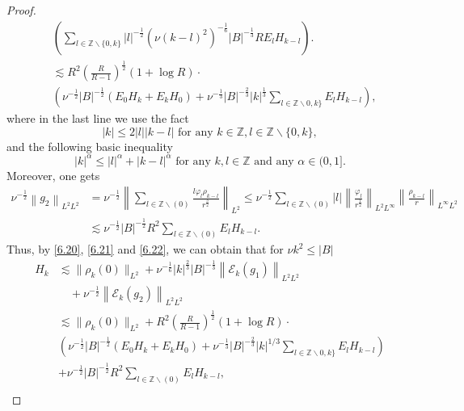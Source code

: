 \documentclass[final, 12pt,reqno]{amsart}
\numberwithin{equation}{section}
\begin{document}
\begin{proof}
\begin{equation}
\begin{aligned}
 &\left(\sum_{l \in \mathbb{Z} \backslash\{0, k\}}|l|^{-\frac{1}{2}}\left(\nu (k-l)^2\right)^{-\frac{1}{6}}|B|^{-\frac{1}{3}} R  E_l H_{k-l}\right) . \\
&   \lesssim   R^2\left(\frac{R}{R-1}\right)^{\frac{1}{2}}(1+\log R)\cdot\\
&\left(\nu^{-\frac{1}{2}}|B|^{-\frac{1}{2}}(E_0 H_k+E_kH_0)+\nu^{-\frac{1}{3}}|B|^{-\frac{2}{3}}|k|^{\frac{1}{3}}\sum_{l \in \mathbb{Z} \backslash 0, k\}} E_l H_{k-l}\right),
\end{aligned}
\end{equation}
where in the last line we use the fact
$$
|k| \leq 2|l||k-l| \text { for any } k \in \mathbb{Z}, l \in \mathbb{Z} \backslash\{0, k\},
$$
and the following basic inequality
 $$|k|^\alpha \leq|l|^\alpha+|k-l|^\alpha\text { for any } k, l \in \mathbb{Z} \text { and any } \alpha \in(0,1].$$
Moreover, one gets
\begin{equation}\label{6.22}
    \begin{aligned}
        \nu^{-\frac{1}{2}}\left\|g_2\right\|_{L^2L^2}&=\nu^{-\frac{1}{2}}\left\|\sum_{l \in \mathbb{Z} \backslash(0)} \frac{l \varphi_l \rho_{k-l}}{r^{\frac{3}{2}}}\right\|_{L^2} \leq \nu^{-\frac{1}{2}}\sum_{l \in \mathbb{Z} \backslash(0)}|l|\left\|\frac{\varphi_l}{r^{\frac{1}{2}}}\right\|_{L^2L^{\infty}}\left\|\frac{\rho_{k-l}}{r}\right\|_{L^\infty L^2}\\
        &\lesssim \nu^{-\frac{1}{2}}|B|^{-\frac{1}{2}}R^2\sum_{l \in \mathbb{Z} \backslash(0)}E_lH_{k-l}.
\end{aligned}
\end{equation}
        Thus, by \eqref{6.20}, \eqref{6.21} and \eqref{6.22}, we can obtain that for $\nu k^2\leq |B|$
     \begin{equation}
         \begin{aligned}
    H_k&\lesssim \|\rho_k(0)\|_{L^2}+\nu^{-\frac{1}{6}}|k|^{\frac{2}{3}}|B|^{-\frac{1}{3}}\left\|\mathcal{E}_k (g_1)\right\|_{L^2 L^2}\\
 &\quad+\nu^{-\frac{1}{2}}\left\|\mathcal{E}_k(g_2)\right\|_{L^2 L^2}\\
    &\lesssim\|\rho_k(0)\|_{L^2}
 +R^2\left(\frac{R}{R-1}\right)^{\frac{1}{2}}(1+\log R)\cdot\\&\left(\nu^{-\frac{1}{2}}|B|^{-\frac{1}{2}}(E_0 H_k+E_kH_0)+\nu^{-\frac{1}{3}}|B|^{-\frac{2}{3}}|k|^{1/3}\sum_{l \in \mathbb{Z} \backslash 0, k\}} E_l H_{k-l}\right)\\
 &+\nu^{-\frac{1}{2}}|B|^{-\frac{1}{2}}R^2\sum_{l \in \mathbb{Z} \backslash(0)}E_lH_{k-l},\\

\end{aligned}
\end{equation}
\end{proof}
\end{document}
